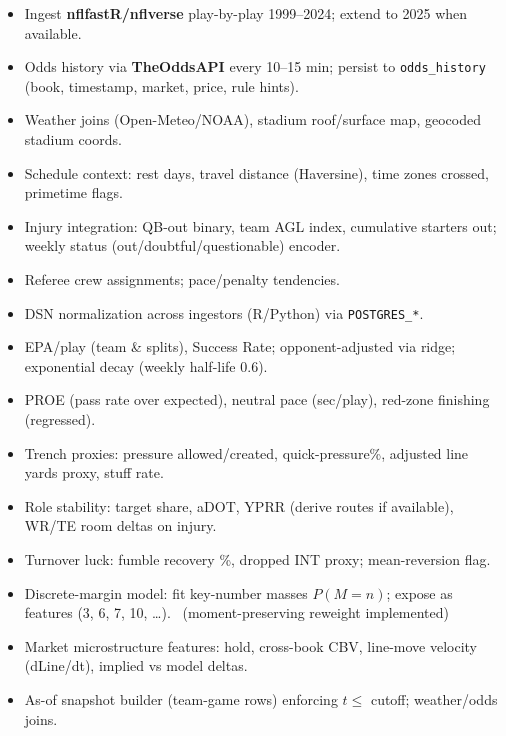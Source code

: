 \begin{itemize}
  \item {} Ingest \textbf{nflfastR/nflverse} play-by-play 1999–2024; extend to 2025 when available.
  \item {} Odds history via \textbf{TheOddsAPI} every 10–15 min; persist to \texttt{odds\_history} (book, timestamp, market, price, rule hints).
  \item {} Weather joins (Open-Meteo/NOAA), stadium roof/surface map, geocoded stadium coords.
  \item {} Schedule context: rest days, travel distance (Haversine), time zones crossed, primetime flags.
  \item {} Injury integration: QB-out binary, team AGL index, cumulative starters out; weekly status (out/doubtful/questionable) encoder.
  \item {} Referee crew assignments; pace/penalty tendencies.
  \item {} DSN normalization across ingestors (R/Python) via \texttt{POSTGRES\_*}. \done
\end{itemize}

\begin{itemize}
  \item {} EPA/play (team \& splits), Success Rate; opponent-adjusted via ridge; exponential decay (weekly half-life 0.6).
  \item {} PROE (pass rate over expected), neutral pace (sec/play), red-zone finishing (regressed).
  \item {} Trench proxies: pressure allowed/created, quick-pressure\%, adjusted line yards proxy, stuff rate.
  \item {} Role stability: target share, aDOT, YPRR (derive routes if available), WR/TE room deltas on injury.
  \item {} Turnover luck: fumble recovery \%, dropped INT proxy; mean-reversion flag.
  \item {} Discrete-margin model: fit key-number masses $P(M=n)$; expose as features (3, 6, 7, 10, \dots). \wip\ (moment-preserving reweight implemented)
  \item {} Market microstructure features: hold, cross-book CBV, line-move velocity (dLine/dt), implied vs model deltas.
  \item {} As-of snapshot builder (team-game rows) enforcing $t\le$ cutoff; weather/odds joins. \done
\end{itemize}

